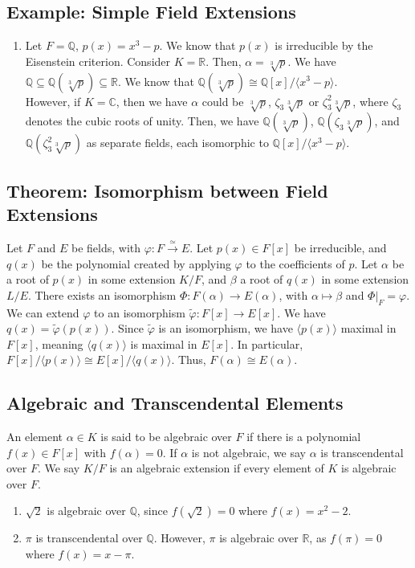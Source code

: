 \documentclass[10pt]{extarticle}
\newcommand{\Q}{\mathbb{Q}}
\newcommand{\R}{\mathbb{R}}
\newcommand{\C}{\mathbb{C}}
\begin{document}
  \subsection{Example: Simple Field Extensions}%
  \begin{enumerate}[(1)]
    \item Let $F = \Q$, $p(x) = x^3 - p$. We know that $p(x)$ is irreducible by the Eisenstein criterion. Consider $K = \R$. Then, $\alpha = \sqrt[3]{p}$. We have $\Q \subseteq \Q(\sqrt[3]{p}) \subseteq \R$. We know that $\Q(\sqrt[3]{p})\cong \Q[x]/\langle x^3-p\rangle$.\\

      However, if $K = \C$, then we have $\alpha$ could be $\sqrt[3]{p}$, $\zeta_3\sqrt[3]{p}$ or $\zeta_3^2\sqrt[3]{p}$, where $\zeta_3$ denotes the cubic roots of unity. Then, we have $\Q(\sqrt[3]{p})$, $\Q(\zeta_3\sqrt[3]{p})$, and $\Q(\zeta_3^2\sqrt[3]{p})$ as separate fields, each isomorphic to $\Q[x]/\langle x^3 - p \rangle$.
  \end{enumerate}
  \subsection{Theorem: Isomorphism between Field Extensions}%
  Let $F$ and $E$ be fields, with $\varphi: F\xrightarrow{\simeq} E$. Let $p(x)\in F[x]$ be irreducible, and $q(x)$ be the polynomial created by applying $\varphi$ to the coefficients of $p$. Let $\alpha$ be a root of $p(x)$ in some extension $K/F$, and $\beta$ a root of $q(x)$ in some extension $L/E$. There exists an isomorphism $\Phi: F(\alpha)\rightarrow E(\alpha)$, with $\alpha \mapsto \beta$ and $\Phi|_F = \varphi$.\\

  We can extend $\varphi$ to an isomorphism $\tilde{\varphi}: F[x]\rightarrow E[x]$. We have $q(x) = \tilde{\varphi}(p(x))$. Since $\tilde{\varphi}$ is an isomorphism, we have $\langle p(x)\rangle $ maximal in $F[x]$, meaning $\langle q(x)\rangle$ is maximal in $E[x]$. In particular, $F[x]/\langle p(x)\rangle \cong E[x]/\langle q(x)\rangle$. Thus, $F(\alpha)\cong E(\alpha)$.
  \subsection{Algebraic and Transcendental Elements}%
  An element $\alpha \in K$ is said to be algebraic over $F$ if there is a polynomial $f(x)\in F[x]$ with $f(\alpha) = 0$. If $\alpha$ is not algebraic, we say $\alpha$ is transcendental over $F$. We say $K/F$ is an algebraic extension if every element of $K$ is algebraic over $F$.
  \begin{enumerate}[(1)]
    \item $\sqrt{2}$ is algebraic over $\Q$, since $f(\sqrt{2}) = 0$ where $f(x) = x^2 - 2$.
    \item $\pi$ is transcendental over $\Q$. However, $\pi$ is algebraic over $\R$, as $f(\pi) = 0$ where $f(x) = x-\pi$.
  \end{enumerate}
\end{document}
